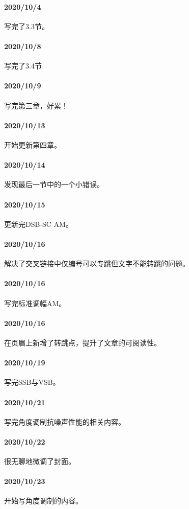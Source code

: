     \paragraph{2020/10/4}写完了3.3节。
    \paragraph{2020/10/8}写完了3.4节
    \paragraph{2020/10/9}写完第三章，好累！
    \paragraph{2020/10/13}开始更新第四章。
    \paragraph{2020/10/14}发现最后一节中的一个小错误。
    \paragraph{2020/10/15}更新完DSB-SC AM。
    \paragraph{2020/10/16}解决了交叉链接中仅编号可以专跳但文字不能转跳的问题。
    \paragraph{2020/10/16}写完标准调幅AM。
    \paragraph{2020/10/16}在页眉上新增了转跳点，提升了文章的可阅读性。
    \paragraph{2020/10/19}写完SSB与VSB。
    \paragraph{2020/10/21}写完角度调制抗噪声性能的相关内容。
    \paragraph{2020/10/22}很无聊地微调了封面。
    \paragraph{2020/10/23}开始写角度调制的内容。
